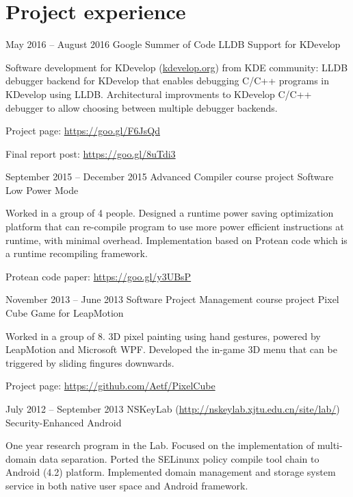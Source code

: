 \documentclass{tccv}
\begin{document}
\section{Project experience}

\begin{eventlist}

\item{May 2016 -- August 2016}
     {Google Summer of Code}
     {LLDB Support for KDevelop}

Software development for KDevelop (\href{https://www.kdevelop.org/}{kdevelop.org}) from KDE community:
LLDB debugger backend for KDevelop that enables debugging C/C++ programs in KDevelop using LLDB.
Architectural improvments to KDevelop C/C++ debugger to allow choosing between multiple debugger backends.

\vspace{0.2em}

Project page: \href{https://goo.gl/F6JsQd}{https://goo.gl/F6JsQd}

Final report post: \href{https://goo.gl/8uTdi3}{https://goo.gl/8uTdi3}

\item{September 2015 -- December 2015}
     {Advanced Compiler course project}
     {Software Low Power Mode}

Worked in a group of 4 people. Designed a runtime power saving optimization platform that can re-compile 
program to use more power efficient instructions at runtime, with minimal overhead. Implementation based on 
Protean code which is a runtime recompiling framework.

Protean code paper: 
\href{https://goo.gl/y3UBsP} {https://goo.gl/y3UBsP} 

\item{November 2013 -- June 2013}
     {Software Project Management course project}
     {Pixel Cube Game for LeapMotion}

Worked in a group of 8. 3D pixel painting using hand gestures, powered by LeapMotion and Microsoft WPF. 
Developed the in-game 3D menu that can be triggered by sliding fingures downwards.

Project page: \href{https://github.com/Aetf/PixelCube}{https://github.com/Aetf/PixelCube}

\item{July 2012 -- September 2013}
     {NSKeyLab (\href{http://nskeylab.xjtu.edu.cn/site/lab/}{http://nskeylab.xjtu.edu.cn/site/lab/})}
     {Security-Enhanced Android}

One year research program in the Lab. Focused on the implementation of multi-domain data separation. Ported 
the SELinunx policy compile tool chain to Android (4.2) platform. Implemented domain management and storage 
system service in both native user space and Android framework.


\end{eventlist}
\end{document}
